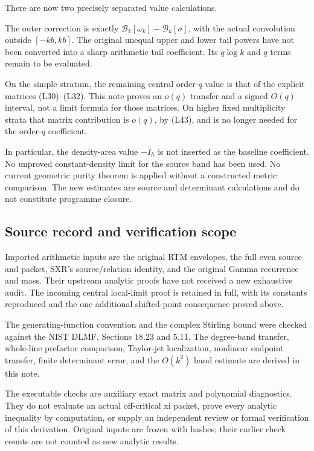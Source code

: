 \documentclass[11pt,a4paper]{article}
\begin{document}
There are now two precisely separated value calculations.

The outer correction is exactly \(\mathcal B_k[\omega_k]-\mathcal B_k[\sigma]\), with the actual convolution outside \([-kb,kb]\). The original unequal upper and lower tail powers have not been converted into a sharp arithmetic tail coefficient. Its \(q\log k\) and \(q\) terms remain to be evaluated.

On the simple stratum, the remaining central order-\(q\) value is that of the explicit matrices (L30)--(L32). This note proves an \(o(q)\) transfer and a signed \(O(q)\) interval, not a limit formula for those matrices. On higher fixed multiplicity strata that matrix contribution is \(o(q)\), by (L43), and is no longer needed for the order-\(q\) coefficient.

In particular, the density-area value \(-I_h\) is not inserted as the baseline coefficient. No unproved constant-density limit for the source band has been used. No current geometric purity theorem is applied without a constructed metric comparison. The new estimates are source and determinant calculations and do not constitute programme closure.

\subsection{Source record and verification scope}\label{loc:source-record-and-verification-scope}

Imported arithmetic inputs are the original RTM envelopes, the full even source and packet, SXR's source/relation identity, and the original Gamma recurrence and mass. Their upstream analytic proofs have not received a new exhaustive audit. The incoming central local-limit proof is retained in full, with its constants reproduced and the one additional shifted-point consequence proved above.

The generating-function convention and the complex Stirling bound were checked against the NIST DLMF, Sections 18.23 and 5.11. The degree-band transfer, whole-line prefactor comparison, Taylor-jet localization, nonlinear endpoint transfer, finite determinant error, and the \(O(k^2)\) band estimate are derived in this note.

The executable checks are auxiliary exact matrix and polynomial diagnostics. They do not evaluate an actual off-critical xi packet, prove every analytic inequality by computation, or supply an independent review or formal verification of this derivation. Original inputs are frozen with hashes; their earlier check counts are not counted as new analytic results.
\end{document}
